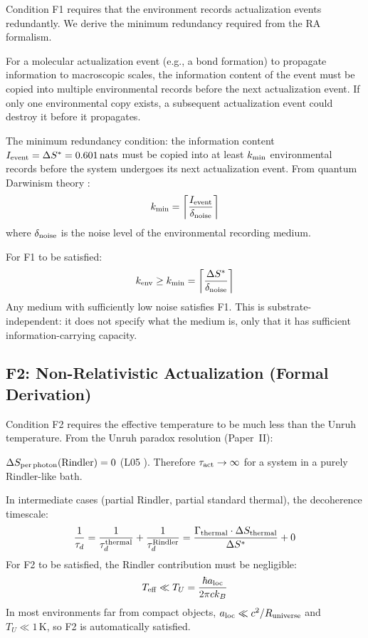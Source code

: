 \documentclass[12pt,a4paper]{article}
\begin{document}
Condition F1 requires that the environment records actualization events redundantly.  We derive the minimum redundancy required from the RA formalism.

For a molecular actualization event (e.g., a bond formation) to propagate information to macroscopic scales, the information content of the event must be copied into multiple environmental records before the next actualization event.  If only one environmental copy exists, a subsequent actualization event could destroy it before it propagates.

The minimum redundancy condition: the information content $I_{\rm event} = \Delta S^* = 0.601\,\mathrm{nats}$ must be copied into at least $k_{\rm min}$ environmental records before the system undergoes its next actualization event.  From quantum Darwinism theory \cite{Zurek2009}:
\begin{equation}
  k_{\rm min} = \left\lceil\frac{I_{\rm event}}{\delta_{\rm noise}}\right\rceil
\end{equation}
where $\delta_{\rm noise}$ is the noise level of the environmental recording medium.

For F1 to be satisfied:
\begin{equation}
  k_{\rm env} \geq k_{\rm min} = \left\lceil\frac{\Delta S^*}{\delta_{\rm noise}}\right\rceil
\end{equation}
Any medium with sufficiently low noise satisfies F1.  This is substrate-independent: it does not specify what the medium is, only that it has sufficient information-carrying capacity.

\subsection{F2: Non-Relativistic Actualization (Formal Derivation)}

Condition F2 requires the effective temperature to be much less than the Unruh temperature.  From the Unruh paradox resolution (Paper~II):

$\Delta S_{\rm per\,photon}(\text{Rindler})=0$ (L05 \statusLV).  Therefore $\tau_{\rm act}\to\infty$ for a system in a purely Rindler-like bath.

In intermediate cases (partial Rindler, partial standard thermal), the decoherence timescale:
\begin{equation}
  \frac{1}{\tau_d} = \frac{1}{\tau_d^{\rm thermal}} + \frac{1}{\tau_d^{\rm Rindler}} = \frac{\Gamma_{\rm thermal}\cdot\Delta S_{\rm thermal}}{\Delta S^*} + 0
\end{equation}
For F2 to be satisfied, the Rindler contribution must be negligible:
\begin{equation}
  T_{\rm eff} \ll T_U = \frac{\hbar a_{\rm loc}}{2\pi ck_B}
\end{equation}
In most environments far from compact objects, $a_{\rm loc}\ll c^2/R_{\rm universe}$ and $T_U\ll1\,\mathrm{K}$, so F2 is automatically satisfied.
\end{document}
